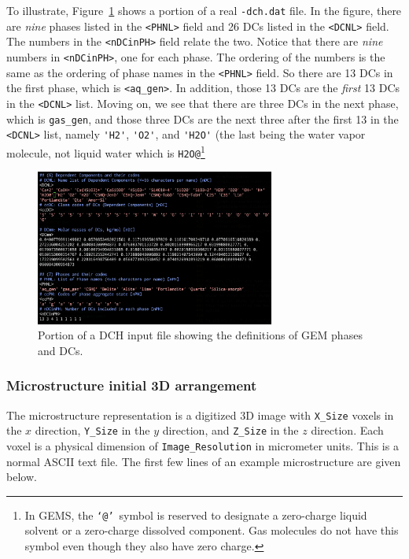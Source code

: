 \documentclass{article}
\begin{document}
To illustrate, Figure~\ref{fig:dchfile} shows a portion of a real \verb!-dch.dat! file.
In the figure, there are \textit{nine} phases listed in the \verb!<PHNL>! field and
26 DCs listed in the \verb!<DCNL>! field.  The numbers in the \verb!<nDCinPH>! field
relate the two.  Notice that there are \textit{nine} numbers in \verb!<nDCinPH>!, one
for each phase. The ordering of the numbers is the same as the ordering of phase
names in the \verb!<PHNL>! field.  So there are 13 DCs in the first phase, which
is \verb!<aq_gen>!.  In addition, those 13 DCs are the \textit{first} 13 DCs in the
\verb!<DCNL>! list.  Moving on, we see that there are three DCs in the next phase, which
is \verb!gas_gen!, and those three DCs are the next three after the first 13 in the
\verb!<DCNL>! list, namely \verb!'H2'!, \verb!'O2'!, and \verb!'H2O'! (the last being
the water vapor molecule, not liquid water which is \verb!H2O@!\footnote{In GEMS, the
\makeatletter\texttt{`@'}\makeatother\ symbol is reserved to designate
a zero-charge liquid solvent or
a zero-charge dissolved component.  Gas molecules do not have this symbol even though
they also have zero charge.}

\begin{figure}
    \centering\includegraphics[width=0.7\textwidth]{Figures/dchfile.png}
    \caption{\label{fig:dchfile} Portion of a DCH input file showing the definitions
    of GEM phases and DCs.}
\end{figure}

\subsubsection{Microstructure initial 3D arrangement}
The microstructure representation is a digitized 3D image with \verb!X_Size! voxels
in the $x$ direction, \verb!Y_Size! in the $y$ direction, and \verb!Z_Size!
in the $z$ direction.  Each voxel is a physical dimension of
\verb!Image_Resolution! in micrometer units.
This is a normal ASCII text file.  The first few lines of an example microstructure
are given below.
\end{document}
